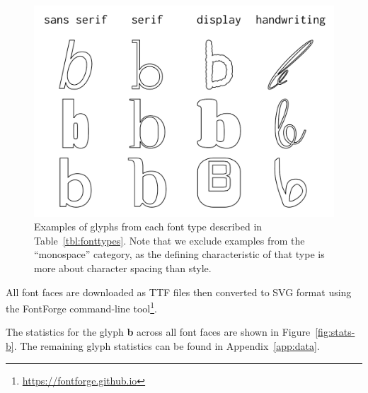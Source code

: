 \begin{figure}[h]
    \centering
	\includegraphics[width=\textwidth]{figures/font_exs}
    \caption[Examples of glyphs from each font type]
    {Examples of glyphs from each font type described in Table~\ref{tbl:fonttypes}.
    Note that we exclude examples from the ``monospace'' category, as the defining characteristic of that type is more about character spacing than style.\label{fig:fonttypes}}
\end{figure}

All font faces are downloaded as TTF files then converted to SVG format using the FontForge command-line tool\footnote{\url{https://fontforge.github.io}}.

The statistics for the glyph \textbf{b} across all font faces are shown in Figure~\ref{fig:stats-b}.
The remaining glyph statistics can be found in Appendix~\ref{app:data}.

